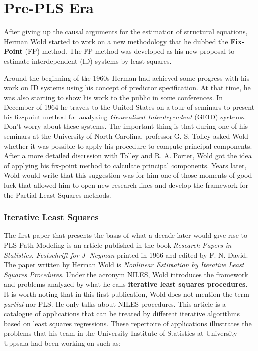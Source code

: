 \documentclass[12pt]{book}\usepackage{graphicx, color}
\begin{document}
\section{Pre-PLS Era}
After giving up the causal arguments for the estimation of structural equations, Herman Wold started to work on a new methodology that he dubbed the \textbf{Fix-Point} (FP) method. The FP method was developed as his new proposal to estimate interdependent (ID) systems by least squares. 

Around the beginning of the 1960s Herman had achieved some progress with his work on ID systems using his concept of predictor specification. At that time, he was also starting to show his work to the public in some conferences. In December of 1964 he travels to the United States on a tour of seminars to present his fix-point method for analyzing \textit{Generalized Interdependent} (GEID) systems. Don't worry about these systems. The important thing is that during one of his seminars at the University of North Carolina, professor G. S. Tolley asked Wold whether it was possible to apply his procedure to compute principal components. After a more detailed discussion with Tolley and R. A. Porter, Wold got the idea of applying his fix-point method to calculate principal components. Years later, Wold would write that this suggestion was for him one of those moments of good luck that allowed him to open new research lines and develop the framework for the Partial Least Squares methods. 



\subsubsection*{Iterative Least Squares}
The first paper that presents the basis of what a decade later would give rise to PLS Path Modeling is an article published in the book \textit{Research Papers in Statistics. Festschrift for J. Neyman} printed in 1966 and edited by F. N. David. The paper written by Herman Wold is \textit{Nonlinear Estimation by Iterative Least Squares Procedures}. Under the acronym NILES, Wold introduces the framework and problems analyzed by what he calls \textbf{iterative least squares procedures}. It is worth noting that in this first publication, Wold does not mention the term \textit{partial} nor PLS. He only talks about NILES procedures. This article is a catalogue of applications that can be treated by different iterative algorithms based on least squares regressions. These repertoire of applications illustrates the problems that his team in the University Institute of Statistics at University Uppsala had been working on such as:
\end{document}
